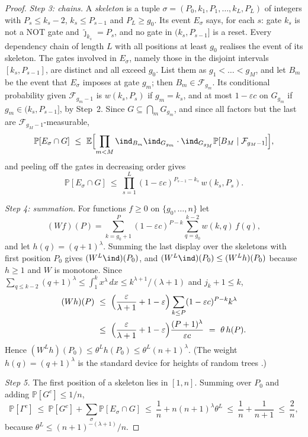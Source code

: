 \documentclass[11pt]{amsart}
\theoremstyle{definition}
\theoremstyle{remark}
\newcommand{\eps}{\varepsilon}
\newcommand{\jt}{\tilde{\jmath}}
\newcommand{\PP}{\mathbb{P}}
\newcommand{\EE}{\mathbb{E}}
\newcommand{\cF}{\mathcal{F}}
\begin{document}
\begin{proof}
\emph{Step 3: chains.} A \emph{skeleton} is a tuple
$\sigma=(P_0,k_1,P_1,\dots,k_L,P_L)$ of integers with
$P_s\le k_s-2$, $k_s\le P_{s-1}$ and $P_L\ge g_0$. Its event $E_\sigma$ says,
for each $s$: gate $k_s$ is not a NOT gate and $\jt_{k_s}=P_s$, and no gate in
$(k_s,P_{s-1}]$ is a reset. Every dependency chain of length $L$ with all
positions at least $g_0$ realises the event of its skeleton. The gates involved
in $E_\sigma$, namely those in the disjoint intervals $[k_s,P_{s-1}]$, are
distinct and all exceed $g_0$. List them as $g_1<\dots<g_M$, and let $B_m$ be
the event that $E_\sigma$ imposes at gate $g_m$; then $B_m\in\cF_{g_m}$. Its
conditional probability given $\cF_{g_m-1}$ is $w(k_s,P_s)$ if $g_m=k_s$, and
at most $1-\eps c$ on $G_{g_m}$ if $g_m\in(k_s,P_{s-1}]$, by Step~2. Since
$G\subseteq\bigcap_m G_{g_m}$, and since all factors but the last are
$\cF_{g_M-1}$-measurable,
\[
  \PP[E_\sigma\cap G]\ \le\
  \EE\Bigl[\prod_{m<M}\ind_{B_m}\ind_{G_{g_m}}\cdot
  \ind_{G_{g_M}}\PP[B_M\mid\cF_{g_M-1}]\Bigr],
\]
and peeling off the gates in decreasing order gives
\[
  \PP[E_\sigma\cap G]\ \le\ \prod_{s=1}^{L}(1-\eps c)^{P_{s-1}-k_s}\,w(k_s,P_s).
\]

\emph{Step 4: summation.} For functions $f\ge 0$ on $\{g_0,\dots,n\}$ let
\[
  (Wf)(P)=\sum_{k=g_0+1}^{P}(1-\eps c)^{P-k}\sum_{q=g_0}^{k-2}w(k,q)\,f(q),
\]
and let $h(q)=(q+1)^\lambda$. Summing the last display over the skeletons with
first position $P_0$ gives $(W^L\ind)(P_0)$, and $(W^L\ind)(P_0)\le(W^Lh)(P_0)$
because $h\ge 1$ and $W$ is monotone. Since
$\sum_{q\le k-2}(q+1)^\lambda\le\int_1^k x^\lambda\,dx\le k^{\lambda+1}/(\lambda+1)$
and $j_k+1\le k$,
\begin{align*}
  (Wh)(P)&\ \le\ \Bigl(\frac{\eps}{\lambda+1}+1-\eps\Bigr)
  \sum_{k\le P}(1-\eps c)^{P-k}k^\lambda\\
  &\ \le\ \Bigl(\frac{\eps}{\lambda+1}+1-\eps\Bigr)\frac{(P+1)^\lambda}{\eps c}
  \ =\ \theta\,h(P).
\end{align*}
Hence $(W^Lh)(P_0)\le\theta^Lh(P_0)\le\theta^L(n+1)^\lambda$. (The weight
$h(q)=(q+1)^\lambda$ is the standard device for heights of random trees
\cite{kp-devroye,kp-pittel}.)

\emph{Step 5.} The first position of a skeleton lies in $[1,n]$. Summing over
$P_0$ and adding $\PP[G^c]\le 1/n$,
\[
  \PP[\Gamma^c]\ \le\ \PP[G^c]+\sum_{\sigma}\PP[E_\sigma\cap G]
  \ \le\ \frac1n+n(n+1)^\lambda\theta^L\ \le\ \frac1n+\frac1{n+1}\ \le\ \frac2n,
\]
because $\theta^L\le(n+1)^{-(\lambda+1)}/n$.
\end{proof}
\end{document}
